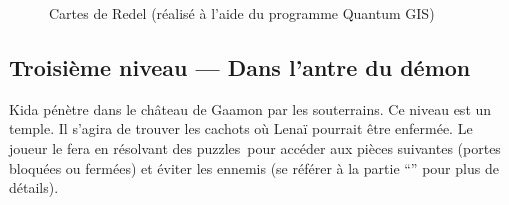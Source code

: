 \begin{figure}[ph!]
	\centering	
	
	
	\caption{\label{fig:carteQuartierPauvre}Cartes de Redel (réalisé à l'aide du programme Quantum GIS)}
\end{figure}


\subsection[Niveau 3 --- Dans l'antre du démon]{Troisième niveau --- Dans l'antre du démon}
\label{sec:entreDemon}
Kida pénètre dans le château de Gaamon par les souterrains. Ce niveau est un temple. Il s'agira de trouver les cachots où Lenaï pourrait être enfermée. Le joueur le fera en résolvant des puzzles\ pour accéder aux pièces suivantes (portes bloquées ou fermées) et éviter les ennemis (se référer à la partie \enquote{} pour plus de détails).

